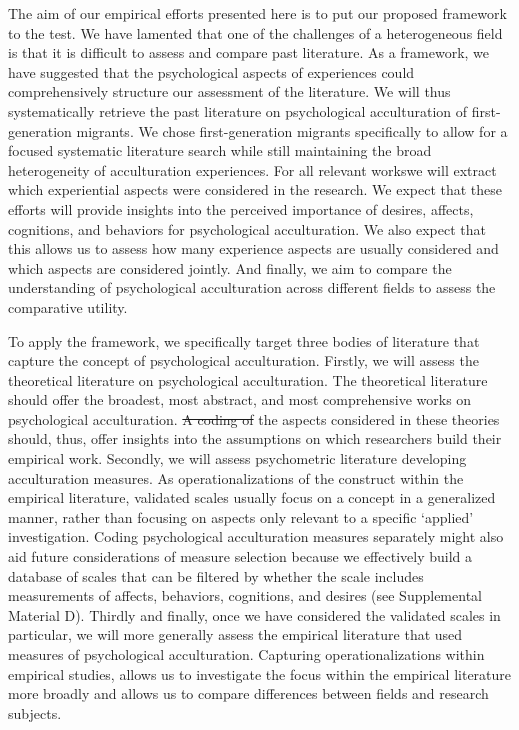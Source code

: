 \documentclass[man, 12pt, a4paper, mask]{apa7}
\providecommand{\DIFaddtex}[1]{{\protect\color{blue}\uwave{#1}}} %
\providecommand{\DIFdeltex}[1]{{\protect\color{red}\sout{#1}}}                      %
\providecommand{\DIFaddbegin}{} %
\providecommand{\DIFaddend}{} %
\providecommand{\DIFdelbegin}{} %
\providecommand{\DIFdelend}{} %
\providecommand{\DIFadd}[1]{\texorpdfstring{\DIFaddtex{#1}}{#1}} %
\providecommand{\DIFdel}[1]{\texorpdfstring{\DIFdeltex{#1}}{}} %
\newcommand{\DIFscaledelfig}{0.5}
\newlength{\DIFdelgraphicswidth} %
\newlength{\DIFdelgraphicsheight} %
\newcommand{\DIFaddincludegraphics}[2][]{{\color{blue}\fbox{\DIFOincludegraphics[#1]{#2}}}} %
\newcommand{\DIFdelincludegraphics}[2][]{%
\sbox{\DIFdelgraphicsbox}{\DIFOincludegraphics[#1]{#2}}%
\settoboxwidth{\DIFdelgraphicswidth}{\DIFdelgraphicsbox} %
\settoboxtotalheight{\DIFdelgraphicsheight}{\DIFdelgraphicsbox} %
\scalebox{\DIFscaledelfig}{%
\parbox[b]{\DIFdelgraphicswidth}{\usebox{\DIFdelgraphicsbox}\\[-\baselineskip] \rule{\DIFdelgraphicswidth}{0em}}\llap{\resizebox{\DIFdelgraphicswidth}{\DIFdelgraphicsheight}{%
\setlength{\unitlength}{\DIFdelgraphicswidth}%
\begin{picture}(1,1)%
\thicklines\linethickness{2pt} %
{\color[rgb]{1,0,0}\put(0,0){\framebox(1,1){}}}%
{\color[rgb]{1,0,0}\put(0,0){\line( 1,1){1}}}%
{\color[rgb]{1,0,0}\put(0,1){\line(1,-1){1}}}%
\end{picture}%
}\hspace*{3pt}}} %
} %
\DeclareRobustCommand{\DIFaddbegin}{\DIFOaddbegin \let\includegraphics\DIFaddincludegraphics} %
\DeclareRobustCommand{\DIFaddend}{\DIFOaddend \let\includegraphics\DIFOincludegraphics} %
\DeclareRobustCommand{\DIFdelbegin}{\DIFOdelbegin \let\includegraphics\DIFdelincludegraphics} %
\DeclareRobustCommand{\DIFdelend}{\DIFOaddend \let\includegraphics\DIFOincludegraphics} %
\begin{document}
The aim of our empirical efforts presented here is to put our proposed framework to the test. We have lamented that one of the challenges of a heterogeneous field is that it is difficult to assess and compare past literature. As a framework, we have suggested that the psychological aspects of experiences could comprehensively structure our assessment of the literature. We will thus systematically retrieve the past literature on psychological acculturation of first-generation migrants. We chose first-generation migrants specifically to allow for a focused systematic literature search while still maintaining the broad heterogeneity of acculturation experiences. For all relevant works\DIFaddbegin \DIFadd{, }\DIFaddend we will extract which experiential aspects were considered in the research. We expect that these efforts will provide insights into the perceived importance of desires, affects, cognitions, and behaviors for psychological acculturation. We also expect that this allows us to assess how many experience aspects are usually considered and which aspects are considered jointly. And finally, we aim to compare the understanding of psychological acculturation across different fields to assess the comparative utility. 

To apply the framework, we specifically target three bodies of literature that capture the concept of psychological acculturation. Firstly, we will assess the theoretical literature on psychological acculturation. The theoretical literature should offer the broadest, most abstract, and most comprehensive works on psychological acculturation. \DIFdelbegin \DIFdel{A coding of }\DIFdelend \DIFaddbegin \DIFadd{Coding }\DIFaddend the aspects considered in these theories should, thus, offer insights into the assumptions on which researchers build their empirical work.
Secondly, we will assess psychometric literature developing acculturation measures. As operationalizations of the construct within the empirical literature, validated scales usually focus on a concept in a generalized manner, rather than focusing on aspects only relevant to a specific `applied' investigation. Coding psychological acculturation measures separately might also aid future considerations of measure selection because we effectively build a database of scales that can be filtered by whether the scale includes measurements of affects, behaviors, cognitions, and desires (see Supplemental Material D). 
Thirdly and finally, once we have considered the validated scales in particular, we will more generally assess the empirical literature that used measures of psychological acculturation. Capturing operationalizations within empirical studies, allows us to investigate the focus within the empirical literature more broadly and allows us to compare differences between fields and research subjects.
\end{document}
